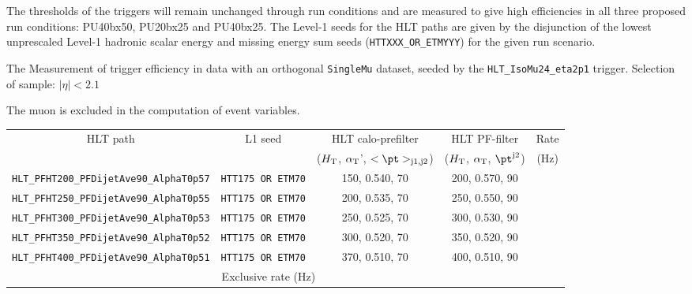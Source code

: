 The thresholds of the triggers will remain unchanged through run conditions and are measured to give high efficiencies in all three proposed run conditions: PU40bx50, PU20bx25 and PU40bx25. The Level-1 seeds for the HLT paths are given by the disjunction of the lowest unprescaled Level-1 hadronic scalar energy and missing energy sum seeds (\verb!HTTXXX_OR_ETMYYY!) for the given run scenario.


The Measurement of trigger efficiency in data with an orthogonal \verb!SingleMu! dataset, seeded by the \verb!HLT_IsoMu24_eta2p1! trigger.
Selection of sample: $|\eta| < 2.1$

The muon is excluded in the computation of event variables.


\begin{table}[h!]
\footnotesize
\centering
\begin{tabular}{c|ccc|c} 
\hline
\hline
HLT path & L1 seed & HLT calo-prefilter                      & HLT PF-filter                          & Rate \\[0.7 ex] 
         &         & ($\mbox{$H_\text{T}$}$, $\alpha_{\text{T}}$', $<\pt>_{\rm j1, j2}$) & ($\mbox{$H_\text{T}$}$, $\alpha_{\text{T}}$, $\pt^{\rm j2}$) & (Hz) \\[0.7 ex] 
\hline
\verb!HLT_PFHT200_PFDijetAve90_AlphaT0p57! & \verb!HTT175 OR ETM70! & 150, 0.540, 70 & 200, 0.570, 90 & \\ %
\verb!HLT_PFHT250_PFDijetAve90_AlphaT0p55! & \verb!HTT175 OR ETM70! & 200, 0.535, 70 & 250, 0.550, 90 & \\ %
\verb!HLT_PFHT300_PFDijetAve90_AlphaT0p53! & \verb!HTT175 OR ETM70! & 250, 0.525, 70 & 300, 0.530, 90 & \\ %
\verb!HLT_PFHT350_PFDijetAve90_AlphaT0p52! & \verb!HTT175 OR ETM70! & 300, 0.520, 70 & 350, 0.520, 90 & \\ %
\verb!HLT_PFHT400_PFDijetAve90_AlphaT0p51! & \verb!HTT175 OR ETM70! & 370, 0.510, 70 & 400, 0.510, 90 & \\ %
\hline
\multicolumn{4}{c|}{Exclusive rate (Hz)} & \\ %
\hline
\hline

\end{tabular}
\label{tab:2015_Hadronic_Signal_Triggers}
\end{table}



